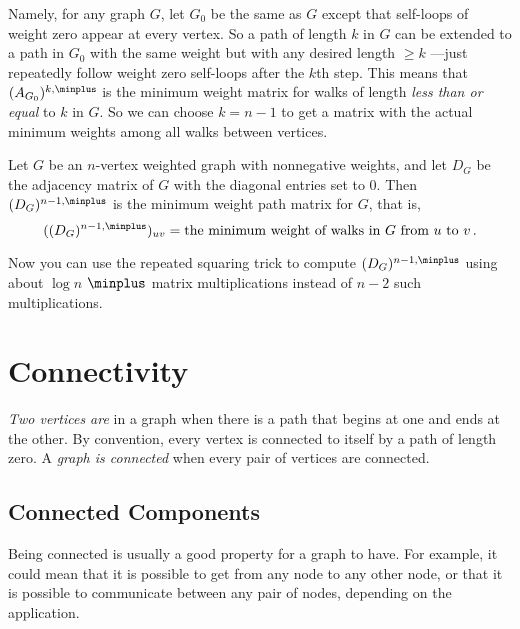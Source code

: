 \begin{editingnotes}
Namely, for any graph $G$, let $G_0$ be the same as $G$ except that
self-loops of weight zero appear at every vertex.  So a path of length $k$
in $G$ can be extended to a path in $G_0$ with the same weight but with
any desired length $ \geq k$ ---just repeatedly follow weight zero
self-loops after the $k$th step.  This means that $(A_{G_0})^{k, \minplus}$
is the minimum weight matrix for walks of length \emph{less than or equal}
to $k$ in $G$.  So we can choose $k = n-1$ to get a matrix with the
actual minimum weights among all walks between vertices.

\begin{theorem}\label{thm:minweightmatrix}
Let $G$ be an $n$-vertex weighted graph with nonnegative weights, and let
$D_G$ be the adjacency matrix of $G$ with the diagonal entries set to 0.
Then $(D_G)^{n-1, \minplus}$ is the minimum weight path matrix for $G$, that
is,
\[
((D_G)^{n-1, \minplus})_{uv} = \text{the minimum weight of walks in $G$ from
 $u$ to $v$}\,.
\]
\end{theorem}
Now you can use the repeated squaring trick to compute $(D_G)^{n-1,
  \minplus}$ using about $\log n$ $\minplus$ matrix multiplications
instead of $n-2$ such multiplications.


\end{editingnotes}
\fi

\section{Connectivity}

\begin{definition}\label{def:connected-vertices} %
  \emph{Two vertices are}  in a graph when there is a
  path that begins at one and ends at the other.  By convention, every
  vertex is connected to itself by a path of length zero.  A
  \emph{graph is connected} when every pair of vertices are connected.
\end{definition}

\subsection{Connected Components}

Being connected is usually a good property for a graph to have.  For
example, it could mean that it is possible to get from any node to any
other node, or that it is possible to communicate between any pair of
nodes, depending on the application.

